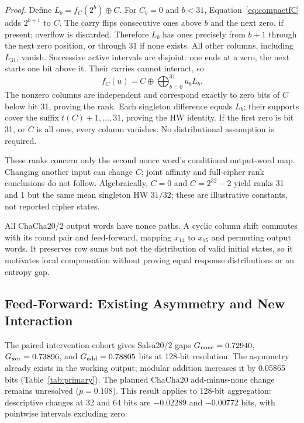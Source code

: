 \documentclass[electronics,article,submit,pdftex,oneauthor]{Definitions/mdpi}
\begin{document}
\emph{Proof.} Define $L_b=f_C(2^b)\oplus C$. For $C_b=0$ and $b<31$, Equation~\eqref{eq:compactfC} adds $2^{b+1}$ to $C$. The carry flips consecutive ones above $b$ and the next zero, if present; overflow is discarded. Therefore $L_b$ has ones precisely from $b+1$ through the next zero position, or through 31 if none exists. All other columns, including $L_{31}$, vanish. Successive active intervals are disjoint: one ends at a zero, the next starts one bit above it. Their carries cannot interact, so
\[
 f_C(u)=C\oplus\bigoplus_{b=0}^{31}u_bL_b.
\]
The nonzero columns are independent and correspond exactly to zero bits of $C$ below bit 31, proving the rank. Each singleton difference equals $L_b$; their supports cover the suffix $t(C)+1,\ldots,31$, proving the HW identity. If the first zero is bit 31, or $C$ is all ones, every column vanishes. No distributional assumption is required.

These ranks concern only the second nonce word's conditional output-word map. Changing another input can change $C$; joint affinity and full-cipher rank conclusions do not follow. Algebraically, $C=0$ and $C=2^{32}-2$ yield ranks 31 and 1 but the same mean singleton HW $31/32$; these are illustrative constants, not reported cipher states.

All ChaCha20/2 output words have nonce paths. A cyclic column shift commutes with its round pair and feed-forward, mapping $x_{14}$ to $x_{15}$ and permuting output words. It preserves row sums but not the distribution of valid initial states, so it motivates local compensation without proving equal response distributions or an entropy gap.


\subsection{Feed-Forward: Existing Asymmetry and New Interaction}\label{sec:ffresults}

The paired intervention cohort gives Salsa20/2 gaps $G_{\rm none}=0.72940$, $G_{\rm xor}=0.73896$, and $G_{\rm add}=0.78805$ bits at 128-bit resolution. The asymmetry already exists in the working output; modular addition increases it by 0.05865 bits (Table~\ref{tab:primary}). The planned ChaCha20 add-minus-none change remains unresolved ($p=0.108$). This result applies to 128-bit aggregation: descriptive changes at 32 and 64 bits are $-0.02289$ and $-0.00772$ bits, with pointwise intervals excluding zero.
\end{document}
